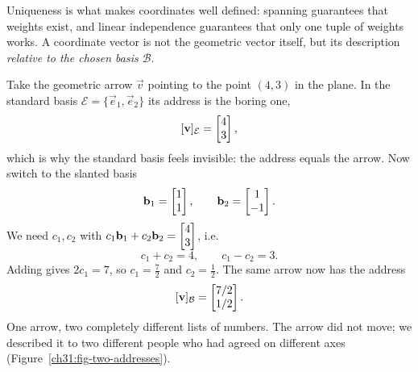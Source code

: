 Uniqueness is what makes coordinates well defined: spanning guarantees that
weights exist, and linear independence guarantees that only one tuple of weights works.
A coordinate vector is not the geometric vector itself, but its description \emph{relative to
the chosen basis $\mathcal{B}$}.

\begin{example}
\label{ch31:ex-two-addresses}
Take the geometric arrow $\vec{v}$ pointing to the point $(4,3)$ in the
plane. In the standard basis $\mathcal{E}=\{\vec{e}_1,\vec{e}_2\}$ its address is
the boring one,
\[
  [\mathbf{v}]_{\mathcal{E}} = \begin{bmatrix}4\\3\end{bmatrix},
\]
which is why the standard basis feels invisible: the address equals the arrow.
Now switch to the slanted basis
\[
  \mathbf{b}_1 = \begin{bmatrix}1\\1\end{bmatrix}, \qquad \mathbf{b}_2 = \begin{bmatrix}1\\-1\end{bmatrix}.
\]
We need $c_1,c_2$ with $c_1\mathbf{b}_1 + c_2\mathbf{b}_2 = \begin{bmatrix}4\\3\end{bmatrix}$, i.e.
\[
  c_1 + c_2 = 4, \qquad c_1 - c_2 = 3.
\]
Adding gives $2c_1 = 7$, so $c_1 = \tfrac72$ and $c_2 = \tfrac12$. The same arrow
now has the address
\[
  [\mathbf{v}]_{\mathcal{B}} = \begin{bmatrix}7/2 \\ 1/2\end{bmatrix}.
\]
One arrow, two completely different lists of numbers. The arrow did not move; we
described it to two different people who had agreed on different axes
(Figure~\ref{ch31:fig-two-addresses}).
\end{example}

